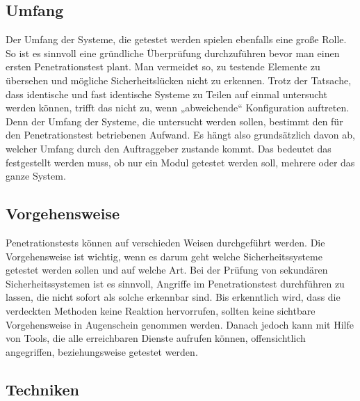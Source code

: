 \subsection{Umfang}

Der Umfang der Systeme, die getestet werden spielen ebenfalls eine große Rolle. So ist es sinnvoll eine gründliche Überprüfung durchzuführen bevor man einen ersten Penetrationstest plant. Man vermeidet so, zu testende Elemente zu übersehen und mögliche Sicherheitslücken nicht zu erkennen. Trotz der Tatsache, dass identische und fast identische Systeme zu Teilen auf einmal untersucht werden können, trifft das nicht zu, wenn „abweichende“ Konfiguration auftreten. Denn der Umfang der Systeme, die untersucht werden sollen, bestimmt den für den Penetrationstest betriebenen Aufwand. Es hängt also grundsätzlich davon ab, welcher Umfang durch den Auftraggeber zustande kommt. Das bedeutet das festgestellt werden muss, ob nur ein Modul getestet werden soll, mehrere oder das ganze System\cite[14--15]{pt03bsi}. 

\subsection{Vorgehensweise}

Penetrationstests können auf verschieden Weisen durchgeführt werden. Die Vorgehensweise ist wichtig, wenn es darum geht welche Sicherheitssysteme getestet werden sollen und auf welche Art. Bei der Prüfung von sekundären Sicherheitssystemen ist es sinnvoll, Angriffe im Penetrationstest durchführen zu lassen, die nicht sofort als solche erkennbar sind. Bis erkenntlich wird, dass die verdeckten Methoden keine Reaktion hervorrufen, sollten keine sichtbare Vorgehensweise in Augenschein genommen werden. Danach jedoch kann mit Hilfe von Tools, die alle erreichbaren Dienste aufrufen können, offensichtlich angegriffen, beziehungsweise getestet werden\cite[15]{pt03bsi}. 

\subsection{Techniken}


